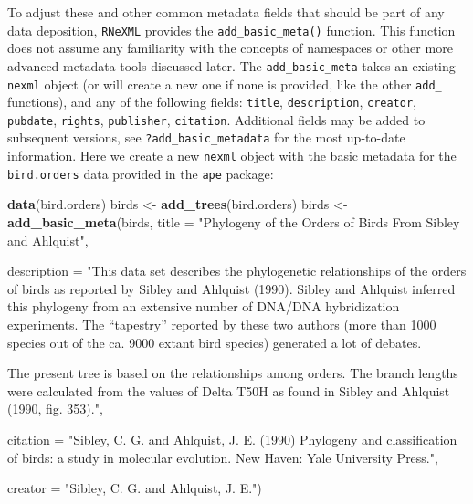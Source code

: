 \documentclass[author-year, review, 11pt]{components/elsarticle} %
\newenvironment{Shaded}{\begin{snugshade}}{\end{snugshade}}
\newcommand{\KeywordTok}[1]{\textcolor[rgb]{0.13,0.29,0.53}{\textbf{{#1}}}}
\newcommand{\DataTypeTok}[1]{\textcolor[rgb]{0.13,0.29,0.53}{{#1}}}
\newcommand{\StringTok}[1]{\textcolor[rgb]{0.31,0.60,0.02}{{#1}}}
\newcommand{\NormalTok}[1]{{#1}}
\begin{document}
To adjust these and other common metadata fields that should be part of
any data deposition, \texttt{RNeXML} provides the
\texttt{add\_basic\_meta()} function. This function does not assume any
familiarity with the concepts of namespaces or other more advanced
metadata tools discussed later. The \texttt{add\_basic\_meta} takes an
existing \texttt{nexml} object (or will create a new one if none is
provided, like the other \texttt{add\_} functions), and any of the
following fields: \texttt{title}, \texttt{description},
\texttt{creator}, \texttt{pubdate}, \texttt{rights}, \texttt{publisher},
\texttt{citation}. Additional fields may be added to subsequent
versions, see \texttt{?add\_basic\_metadata} for the most up-to-date
information. Here we create a new \texttt{nexml} object with the basic
metadata for the \texttt{bird.orders} data provided in the \texttt{ape}
package:

\begin{Shaded}
\begin{Highlighting}[]
\KeywordTok{data}\NormalTok{(bird.orders)}
\NormalTok{birds <-}\StringTok{ }\KeywordTok{add_trees}\NormalTok{(bird.orders)}
\NormalTok{birds <-}\StringTok{ }\KeywordTok{add_basic_meta}\NormalTok{(birds,}
  \DataTypeTok{title =} \StringTok{"Phylogeny of the Orders of Birds From Sibley and Ahlquist"}\NormalTok{,}

  \DataTypeTok{description =} \StringTok{"This data set describes the phylogenetic relationships of the}
\StringTok{     orders of birds as reported by Sibley and Ahlquist (1990). Sibley}
\StringTok{     and Ahlquist inferred this phylogeny from an extensive number of}
\StringTok{     DNA/DNA hybridization experiments. The ``tapestry'' reported by}
\StringTok{     these two authors (more than 1000 species out of the ca. 9000}
\StringTok{     extant bird species) generated a lot of debates.}

\StringTok{     The present tree is based on the relationships among orders. The}
\StringTok{     branch lengths were calculated from the values of Delta T50H as}
\StringTok{     found in Sibley and Ahlquist (1990, fig. 353)."}\NormalTok{,}

  \DataTypeTok{citation =} \StringTok{"Sibley, C. G. and Ahlquist, J. E. (1990) Phylogeny and}
\StringTok{     classification of birds: a study in molecular evolution. New}
\StringTok{     Haven: Yale University Press."}\NormalTok{,}

  \DataTypeTok{creator =} \StringTok{"Sibley, C. G. and Ahlquist, J. E."}\NormalTok{)}
\end{Highlighting}
\end{Shaded}
\end{document}
